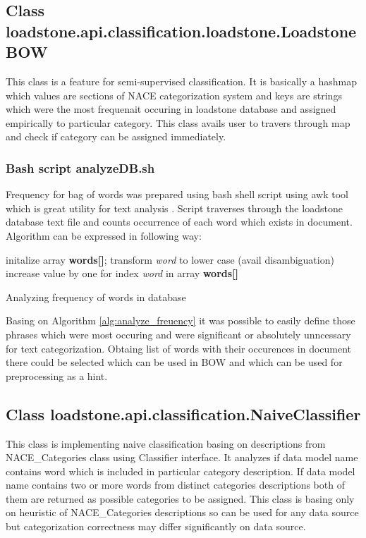 \subsection{Class loadstone.api.classification.loadstone.LoadstoneBOW}
\label{loadstone_bow}
This class is a feature for semi-supervised classification. It is basically a hashmap which values are sections of NACE categorization system and keys are strings which were the most frequenait occuring in loadstone database and assigned empirically to particular category. This class avails user to travers through map and check if category can be assigned immediately. 
\subsubsection{Bash script analyzeDB.sh}
\label{analyze_db}
Frequency for bag of words was prepared using bash shell script using awk tool which is great utility for text analysis \cite{21}. Script traverses through the loadstone database text file and counts occurrence of each word which exists in document. Algorithm can be expressed in following way:
\begin{algorithm}[h]
	initalize array \textbf{words[]};
	\newline
	{
		transform \textit{word} to lower case (avail disambiguation)
		\newline
		increase value by one for index \textit{word} in array \textbf{words[]} 
	}
\caption{Analyzing frequency of words in database}\label{alg:analyze_freuency}
\end{algorithm}

Basing on Algorithm \ref{alg:analyze_freuency} it was possible to easily define those phrases which were most occuring and were significant or absolutely unncessary for text categorization. Obtaing list of words with their occurences in document there could be selected which can be used in BOW and which can be used for preprocessing as a hint.

\subsection{Class loadstone.api.classification.NaiveClassifier}
\label{naive_classifier}
This class is implementing naive classification basing on descriptions from NACE\_Categories class using Classifier interface. It analyzes if data model name contains word which is included in particular category description. If data model name contains two or more words from distinct categories descriptions both of them are returned as possible categories to be assigned. This class is basing only on heuristic of NACE\_Categories descriptions so can be used for any data source but categorization correctness may differ significantly on data source.

